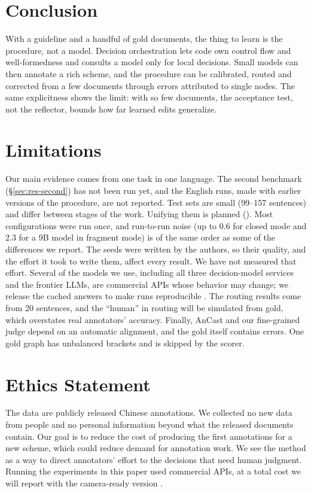 \section{Conclusion}
\label{sec:conclusion}

With a guideline and a handful of gold documents, the thing to learn is the procedure, not a model. Decision orchestration lets code own control flow and well-formedness and consults a model only for local decisions. Small models can then annotate a rich scheme, and the procedure can be calibrated, routed and corrected from a few documents through errors attributed to single nodes. The same explicitness shows the limit: with so few documents, the acceptance test, not the reflector, bounds how far learned edits generalize. 

\section*{Limitations}
Our main evidence comes from one task in one language. The second benchmark (\S\ref{sec:res-second}) has not been run yet, and the English \umr runs, made with earlier versions of the procedure, are not reported. Test sets are small (99--157 sentences) and differ between stages of the work. Unifying them is planned (). Most configurations were run once, and run-to-run noise (up to 0.6 \F for closed mode and 2.3 \F for a 9B model in fragment mode) is of the same order as some of the differences we report. The seeds were written by the authors, so their quality, and the effort it took to write them, affect every result. We have not measured that effort. Several of the models we use, including all three decision-model services and the frontier LLMs, are commercial APIs whose behavior may change; we release the cached answers to make runs reproducible . The routing results come from 20 sentences, and the ``human'' in routing will be simulated from gold, which overstates real annotators' accuracy. Finally, AnCast and our fine-grained judge depend on an automatic alignment, and the gold itself contains errors. One gold graph has unbalanced brackets and is skipped by the scorer.

\section*{Ethics Statement}
The data are publicly released Chinese \umr annotations. We collected no new data from people and no personal information beyond what the released documents contain. Our goal is to reduce the cost of producing the first annotations for a new scheme, which could reduce demand for annotation work. We see the method as a way to direct annotators' effort to the decisions that need human judgment. Running the experiments in this paper used commercial APIs, at a total cost we will report with the camera-ready version .
